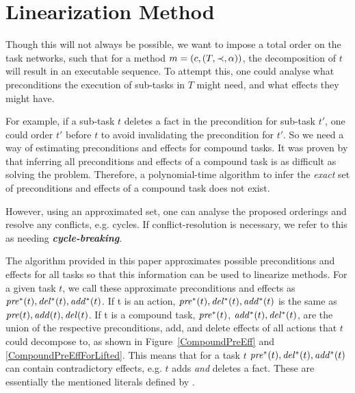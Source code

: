 \chapter{Linearization Method}\label{chap:content}

Though this will not always be possible, we want to impose a total order on the task networks, such that for a method $m = (c, (T, \mathit{ \mathord{\prec} }, \alpha))$, the decomposition of $t$ will result in an executable sequence. To attempt this, one could analyse what preconditions the execution of sub-tasks in $T$ might need, and what effects they might have. 


For example, if a sub-task $t$ deletes a fact in the precondition for sub-task $t'$, one could order $t'$ before $t$ to avoid invalidating the precondition for $t'$. So we need a way of estimating preconditions and effects for compound tasks. It was proven by \cite{ConnyPreEstimation} that inferring all preconditions and effects of a compound task is as difficult as solving the problem. Therefore, a polynomial-time algorithm to infer the \textit{exact} set of preconditions and effects of a compound task does not exist. 

However, using an approximated set, one can analyse the proposed orderings and resolve any conflicts, e.g. cycles. If conflict-resolution is necessary, we refer to this as needing \textbf{\textit{cycle-breaking}}.

The algorithm provided in this paper approximates possible preconditions and effects for all tasks so that this information can be used to linearize methods. 
For a given task $t$, we  call these approximate preconditions and effects as $\mathit{pre^{*}}(t), \mathit{del^{*}}(t), \mathit{add^{*}}(t)$.
If t is an action, $\mathit{pre^{*}}(t), \mathit{del^{*}}(t), \mathit{add^{*}}(t)$ is the same as $\mathit{pre}(t), \mathit{add}(t), \mathit{del}(t)$. 
If t is a compound task, $\mathit{pre^{*}}(t)$, $\mathit{add^{*}}(t),  \mathit{del^{*}}(t)$, are the union of the respective preconditions, add, and delete effects of all actions that $t$ could decompose to, as shown in Figure~\ref{CompoundPreEff} and \ref{CompoundPreEffForLifted}.
This means that for a task $t$ $\mathit{pre^{*}}(t), \mathit{del^{*}}(t), \mathit{add^{*}}(t)$ can contain contradictory effects, e.g. $t$ adds \emph{and} deletes a fact. These are essentially the mentioned literals defined by \cite{mentionedliterals}.

